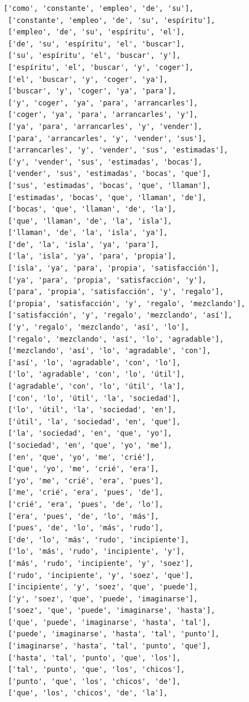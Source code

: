 \documentclass[11pt]{article}
\begin{document}
\begin{tcolorbox}[breakable, size=fbox, boxrule=1pt, pad at break*=1mm,colback=cellbackground, colframe=cellborder]
\begin{Verbatim}[commandchars=\\\{\}]
 ['como', 'constante', 'empleo', 'de', 'su'],
 ['constante', 'empleo', 'de', 'su', 'espíritu'],
 ['empleo', 'de', 'su', 'espíritu', 'el'],
 ['de', 'su', 'espíritu', 'el', 'buscar'],
 ['su', 'espíritu', 'el', 'buscar', 'y'],
 ['espíritu', 'el', 'buscar', 'y', 'coger'],
 ['el', 'buscar', 'y', 'coger', 'ya'],
 ['buscar', 'y', 'coger', 'ya', 'para'],
 ['y', 'coger', 'ya', 'para', 'arrancarles'],
 ['coger', 'ya', 'para', 'arrancarles', 'y'],
 ['ya', 'para', 'arrancarles', 'y', 'vender'],
 ['para', 'arrancarles', 'y', 'vender', 'sus'],
 ['arrancarles', 'y', 'vender', 'sus', 'estimadas'],
 ['y', 'vender', 'sus', 'estimadas', 'bocas'],
 ['vender', 'sus', 'estimadas', 'bocas', 'que'],
 ['sus', 'estimadas', 'bocas', 'que', 'llaman'],
 ['estimadas', 'bocas', 'que', 'llaman', 'de'],
 ['bocas', 'que', 'llaman', 'de', 'la'],
 ['que', 'llaman', 'de', 'la', 'isla'],
 ['llaman', 'de', 'la', 'isla', 'ya'],
 ['de', 'la', 'isla', 'ya', 'para'],
 ['la', 'isla', 'ya', 'para', 'propia'],
 ['isla', 'ya', 'para', 'propia', 'satisfacción'],
 ['ya', 'para', 'propia', 'satisfacción', 'y'],
 ['para', 'propia', 'satisfacción', 'y', 'regalo'],
 ['propia', 'satisfacción', 'y', 'regalo', 'mezclando'],
 ['satisfacción', 'y', 'regalo', 'mezclando', 'así'],
 ['y', 'regalo', 'mezclando', 'así', 'lo'],
 ['regalo', 'mezclando', 'así', 'lo', 'agradable'],
 ['mezclando', 'así', 'lo', 'agradable', 'con'],
 ['así', 'lo', 'agradable', 'con', 'lo'],
 ['lo', 'agradable', 'con', 'lo', 'útil'],
 ['agradable', 'con', 'lo', 'útil', 'la'],
 ['con', 'lo', 'útil', 'la', 'sociedad'],
 ['lo', 'útil', 'la', 'sociedad', 'en'],
 ['útil', 'la', 'sociedad', 'en', 'que'],
 ['la', 'sociedad', 'en', 'que', 'yo'],
 ['sociedad', 'en', 'que', 'yo', 'me'],
 ['en', 'que', 'yo', 'me', 'crié'],
 ['que', 'yo', 'me', 'crié', 'era'],
 ['yo', 'me', 'crié', 'era', 'pues'],
 ['me', 'crié', 'era', 'pues', 'de'],
 ['crié', 'era', 'pues', 'de', 'lo'],
 ['era', 'pues', 'de', 'lo', 'más'],
 ['pues', 'de', 'lo', 'más', 'rudo'],
 ['de', 'lo', 'más', 'rudo', 'incipiente'],
 ['lo', 'más', 'rudo', 'incipiente', 'y'],
 ['más', 'rudo', 'incipiente', 'y', 'soez'],
 ['rudo', 'incipiente', 'y', 'soez', 'que'],
 ['incipiente', 'y', 'soez', 'que', 'puede'],
 ['y', 'soez', 'que', 'puede', 'imaginarse'],
 ['soez', 'que', 'puede', 'imaginarse', 'hasta'],
 ['que', 'puede', 'imaginarse', 'hasta', 'tal'],
 ['puede', 'imaginarse', 'hasta', 'tal', 'punto'],
 ['imaginarse', 'hasta', 'tal', 'punto', 'que'],
 ['hasta', 'tal', 'punto', 'que', 'los'],
 ['tal', 'punto', 'que', 'los', 'chicos'],
 ['punto', 'que', 'los', 'chicos', 'de'],
 ['que', 'los', 'chicos', 'de', 'la'],

\end{Verbatim}
\end{tcolorbox}
\end{document}
